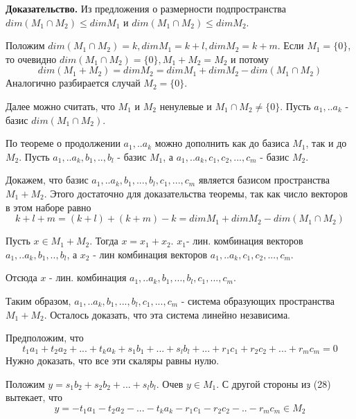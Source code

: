 \documentclass[a4paper]{article}
\begin{document}
\begin{hproof}
\textbf{Доказательство.} Из предложения о размерности подпространства $dim(M_1 \cap M_2) \leq dim M_1$ и $dim(M_1 \cap M_2) \leq dim M_2$.

Положим $dim(M_1 \cap M_2) = k, dim M_1 = k + l, dim M_2 = k + m$. Если $M_1 = \{ 0 \}$, то очевидно $dim(M_1 \cap M_2) = \{ 0 \}, M_1 + M_2  = M_2$ и потому 
\begin{equation}
dim(M_1 + M_2) = dim M_2 = dim M_1 + dim M_2 - dim(M_1 \cap M_2)
\end{equation}
Аналогично разбирается случай $M_2 = \{ 0 \} $. 

Далее можно считать, что $M_1$ и $M_2$ ненулевые и $M_1 \cap M_2 \neq \{ 0 \}$. Пусть $a_1, .. a_k$ - базис $dim(M_1 \cap M_2)$.

По теореме о продолжении $a_1, .. a_k$ можно дополнить как до базиса $M_1$, так и до $M_2$. Пусть $a_1, .. a_k, b_1, .., b_l$ - базис $M_1$, а $a_1, .. a_k,c_1, c_2, ..., c_m$ - базис $M_2$.

Докажем, что базис $a_1, .. a_k, b_1, ..., b_l, c_1, ..., c_m$ является базисом пространства $M_1 + M_2$. Этого достаточно для доказательства теоремы, так как число векторов в этом наборе равно \begin{equation}
k + l + m = (k+l) + (k+m) - k = dim M_1 + dim M_2 -dim (M_1 \cap M_2)
\end{equation}

Пусть $x \in M_1 + M_2$. Тогда $x = x_1 + x_2$. $x_1 $- лин. комбинация векторов $a_1, .. a_k, b_1, .., b_l$, а $x_2$ - лин комбинация векторов $a_1, .. a_k,c_1, c_2, ..., c_m$.

Отсюда $x$ - лин. комбинация $a_1, .. a_k, b_1, ..., b_l, c_1, ..., c_m$. 

Таким образом, $a_1, .. a_k, b_1, ..., b_l, c_1, ..., c_m$ - система образующих пространства $M_1 + M_2$. Осталось доказать, что эта система линейно независима.

Предположим, что
 \begin{equation}
t_1a_1 + t_2a_2 + ... +t_ka_k + s_1b_1 + ... + s_lb_l + ... + r_1c_1 + r_2c_2 + ... + r_mc_m = 0
\end{equation} 
Нужно доказать, что все эти скаляры равны нулю.

Положим $y = s_1b_2 +s_2b_2 + ... + s_lb_l$. Очев $y \in M_1$. С другой стороны из (28) вытекает, что \begin{equation}
y = -t_1a_1 - t_2a_2 -... -t_ka_k - r_1c_1 -r_2c_2 -.. -r_mc_m \in M_2
\end{equation}


\end{hproof}
\end{document}
